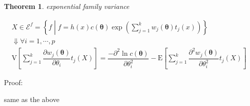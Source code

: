 \documentclass[
]{book}
\newtheorem{theorem}{Theorem}[chapter]
\theoremstyle{definition}
\theoremstyle{definition}
\theoremstyle{definition}
\theoremstyle{definition}
\theoremstyle{remark}
\begin{document}
\[
\tag*{$\Box$}
\]

\begin{theorem}
\protect\hypertarget{thm:unnamed-chunk-39}{}\label{thm:unnamed-chunk-39}exponential family variance
\end{theorem}

\[
\begin{array}{c}
X\in\mathcal{E}^{f}=\left\{ f\middle|f=h\left(x\right)c\left(\boldsymbol{\theta}\right)\exp\left(\sum\limits _{j=1}^{k}w_{{\scriptscriptstyle j}}\left(\boldsymbol{\theta}\right)t_{{\scriptscriptstyle j}}\left(x\right)\right)\right\} \\
\Downarrow\forall i=1,\cdots,p\\
\mathrm{V}\left[\sum\limits _{j=1}^{k}\dfrac{\partial w_{{\scriptscriptstyle j}}\left(\boldsymbol{\theta}\right)}{\partial\theta_{{\scriptscriptstyle i}}}t_{{\scriptscriptstyle j}}\left(X\right)\right]=\dfrac{-\partial^{2}\ln c\left(\boldsymbol{\theta}\right)}{\partial\theta_{{\scriptscriptstyle i}}^{2}}-\mathrm{E}\left[\sum\limits _{j=1}^{k}\dfrac{\partial^{2}w_{{\scriptscriptstyle j}}\left(\boldsymbol{\theta}\right)}{\partial\theta_{{\scriptscriptstyle i}}^{2}}t_{{\scriptscriptstyle j}}\left(X\right)\right]
\end{array}
\]

Proof:

same as the above
\end{document}

